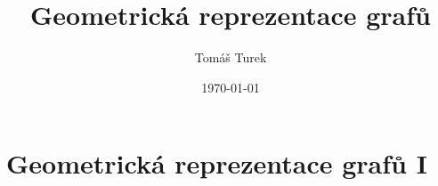 \documentclass[12pt,a4paper]{report}
\title{Geometrická reprezentace grafů}
\author{Tomáš Turek}
\date{\today}
\begin{document}
	\maketitle
	
	\INFO{}
	
	\tableofcontents
	\part{Geometrická reprezentace grafů I}
\end{document}
